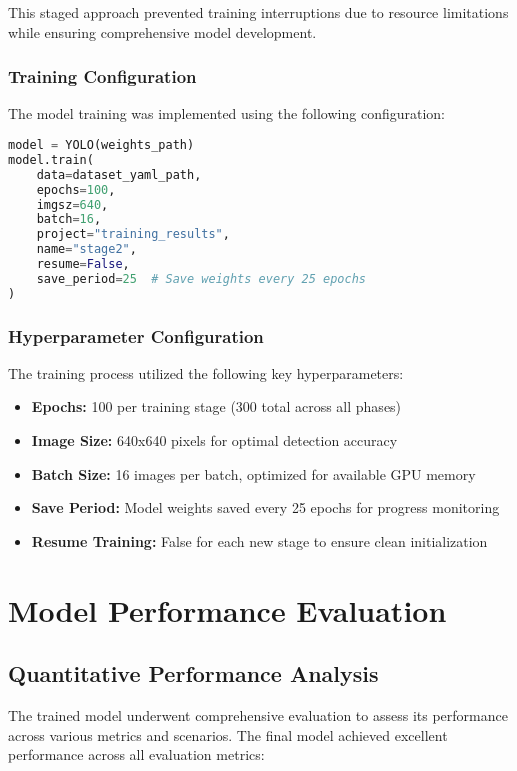 \documentclass[12pt,a4paper]{report}
\begin{document}
This staged approach prevented training interruptions due to resource limitations while ensuring comprehensive model development.

\subsubsection{Training Configuration}

The model training was implemented using the following configuration:

\begin{lstlisting}[language=Python, caption=YOLO Training Configuration]
model = YOLO(weights_path)
model.train( 
    data=dataset_yaml_path,
    epochs=100,
    imgsz=640,
    batch=16,
    project="training_results",
    name="stage2", 
    resume=False,
    save_period=25  # Save weights every 25 epochs
)
\end{lstlisting}

\subsubsection{Hyperparameter Configuration}
The training process utilized the following key hyperparameters:
\begin{itemize}
    \item \textbf{Epochs:} 100 per training stage (300 total across all phases)
    \item \textbf{Image Size:} 640x640 pixels for optimal detection accuracy
    \item \textbf{Batch Size:} 16 images per batch, optimized for available GPU memory
    \item \textbf{Save Period:} Model weights saved every 25 epochs for progress monitoring
    \item \textbf{Resume Training:} False for each new stage to ensure clean initialization
\end{itemize}



\section{Model Performance Evaluation }

\subsection{Quantitative Performance Analysis}

The trained model underwent comprehensive evaluation to assess its performance across various metrics and scenarios. The final model achieved excellent performance across all evaluation metrics:
\end{document}
